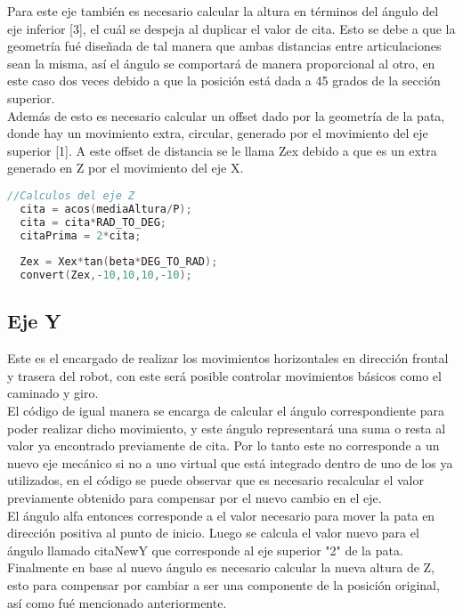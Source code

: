 \documentclass[12pt,letterpaper]{IEEEtran}
\begin{document}
Para este eje también es necesario calcular la altura en términos del ángulo del eje inferior [3], el cuál se despeja al duplicar el valor de cita. Esto se debe a que la geometría fué diseñada de tal manera que ambas distancias entre articulaciones sean la misma, así el ángulo se comportará de manera proporcional al otro, en este caso dos veces debido a que la posición está dada a 45 grados de la sección superior.\\

Además de esto es necesario calcular un offset dado por la geometría de la pata, donde hay un movimiento extra, circular, generado por el movimiento del eje superior [1]. A este offset de distancia se le llama Zex debido a que es un extra generado en Z por el movimiento del eje X.

\begin{lstlisting}[language=c++]
  //Calculos del eje Z
  cita = acos(mediaAltura/P);
  cita = cita*RAD_TO_DEG;
  citaPrima = 2*cita;
  
  Zex = Xex*tan(beta*DEG_TO_RAD);
  convert(Zex,-10,10,10,-10);
\end{lstlisting}
  
\subsection*{Eje Y}
Este es el encargado de realizar los movimientos horizontales en dirección frontal y trasera del robot, con este será posible controlar movimientos básicos como el caminado y giro.\\

El código de igual manera se encarga de calcular el ángulo correspondiente para poder realizar dicho movimiento, y este ángulo representará una suma o resta al valor ya encontrado previamente de cita. Por lo tanto este no corresponde a un nuevo eje mecánico si no a uno virtual que está integrado dentro de uno de los ya utilizados, en el código se puede observar que es necesario recalcular el valor previamente obtenido para compensar por el nuevo cambio en el eje.\\

El ángulo alfa entonces corresponde a el valor necesario para mover la pata en dirección positiva al punto de inicio. Luego se calcula el valor nuevo para el ángulo llamado citaNewY que corresponde al eje superior "2" de la pata.\\

Finalmente en base al nuevo ángulo es necesario calcular la nueva altura de Z, esto para compensar por cambiar a ser una componente de la posición original, así como fué mencionado anteriormente.
\end{document}
